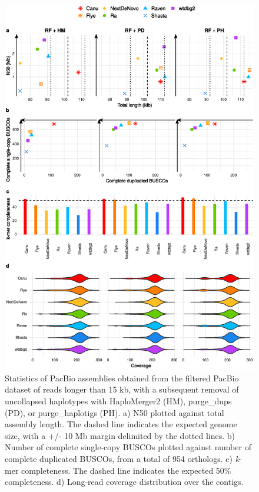     \begin{figure}[ht]
    \centering
     \includegraphics[width=13.5cm]{fig/benchmark/supp_pacbio_filtering_purging_v20201012.eps}
   \caption{Statistics of PacBio assemblies obtained from the filtered PacBio dataset of reads longer than 15 kb, with a subsequent removal of uncollapsed haplotypes with HaploMerger2 (HM), purge\_dups (PD), or purge\_haplotigs (PH). a) N50 plotted against total assembly length. The dashed line indicates the expected genome size, with a +/- 10 Mb margin delimited by the dotted lines. b) Number of complete single-copy BUSCOs plotted against number of complete duplicated BUSCOs, from a total of 954 orthologs. c) \textit{k}-mer completeness. The dashed line indicates the expected 50\% completeness. d) Long-read coverage distribution over the contigs.}
   \label{fig:pacbio_filtering_purging}
 \end{figure}
 
